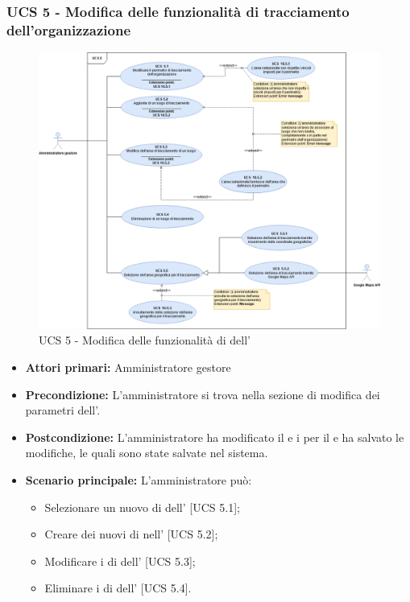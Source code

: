 \newpage
\subsubsection{UCS 5 - Modifica delle funzionalità di tracciamento dell'organizzazione}%
\begin{figure}[h]
	\centering
    \includegraphics[scale=0.40]{Sezioni/UseCase/Immagini/UCS5.png}
    \caption{UCS 5 - Modifica delle funzionalità di  dell'}
\end{figure}
\begin{itemize}
    \item \textbf{Attori primari:} Amministratore gestore
    \item \textbf{Precondizione:} L'amministratore si trova nella sezione di modifica dei parametri dell'.
    \item \textbf{Postcondizione:} L'amministratore ha modificato il  e i  per il  e ha salvato le modifiche, le quali sono state salvate nel sistema.
    \item \textbf{Scenario principale:} L'amministratore può:
    \begin{itemize}    
        \item Selezionare un nuovo  di  dell' [UCS 5.1];
        \item Creare dei nuovi  di  nell' [UCS 5.2];
        \item Modificare i  di  dell' [UCS 5.3];
        \item Eliminare i  di  dell' [UCS 5.4].
    \end{itemize}
\end{itemize}

